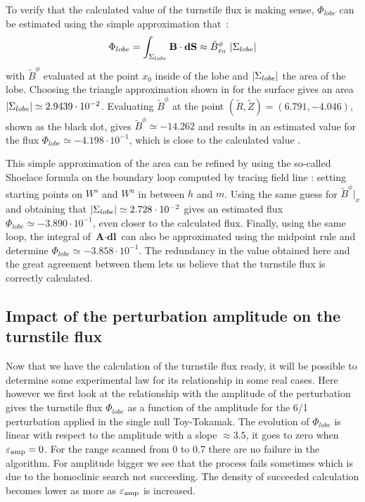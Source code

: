To verify that the calculated value of the turnstile flux is making sense, $\Phi_{lobe}$ can be estimated using the simple approximation that~:
\begin{equation}
     \Phi_{lobe} = \int_{\Sigma_{lobe}} \textbf{B}\cdot\textbf{dS} \approx \tilde{B}^\phi_{x_0}\,\,\vert\Sigma_{lobe}\vert
\end{equation}
with $\tilde{B}^\phi$ evaluated at the point $x_0$ inside of the lobe and $\vert\Sigma_{lobe}\vert$ the area of the lobe. Choosing the triangle approximation shown in  for the surface gives an area $\vert\Sigma_{lobe}\vert \simeq 2.9439\cdot 10^{-2}$. Evaluating $\tilde{B}^\phi$ at the point $(\tilde{R}, \tilde{Z}) = (6.791, -4.046)$, shown as the black dot, gives $\tilde{B}^\phi \simeq -14.262$ and results in an estimated value for the flux $\Phi_{lobe} \simeq -4.198\cdot 10^{-1}$, which is close to the calculated value .

This simple approximation of the area can be refined by using the so-called Shoelace formula on the boundary loop  computed by tracing field line : setting starting points on $W^s$ and $W^u$ in between $h$ and $m$. Using the same guess for $\tilde{B}^\phi\vert_x$ and obtaining that $\vert\Sigma_{lobe}\vert \simeq 2.728\cdot 10^{-2}$ gives an estimated flux $\Phi_{lobe} \simeq  -3.890\cdot 10^{-1}$, even closer to the calculated flux. Finally, using the same loop, the integral of $\textbf{A}\cdot\textbf{dl}$ can also be approximated using the midpoint rule and determine $\Phi_{lobe} \simeq  -3.858\cdot 10^{-1}$. The redundancy in the value obtained here and the great agreement between them lets us believe that the turnstile flux is correctly calculated.

\subsection{Impact of the perturbation amplitude on the turnstile flux}
\newcommand{\tf}{\Phi_{lobe}}

Now that we have the calculation of the turnstile flux ready, it will be possible to determine some experimental law for its relationship in some real cases. Here however we first look at the relationship with the amplitude of the perturbation   gives the turnstile flux $\tf$ as a function of the amplitude for the 6/1 perturbation applied in the single null Toy-Tokamak. The evolution of $\tf$ is linear with respect to the amplitude with a slope $\approx 3.5$, it goes to zero when $\varepsilon_\text{amp} = 0$. For the range scanned from 0 to 0.7 there are no failure in the algorithm. For amplitude bigger we see that the process fails sometimes which is due to the homoclinic search not succeeding. The density of succeeded calculation becomes lower as more as $\varepsilon_\text{amp}$ is increased.


